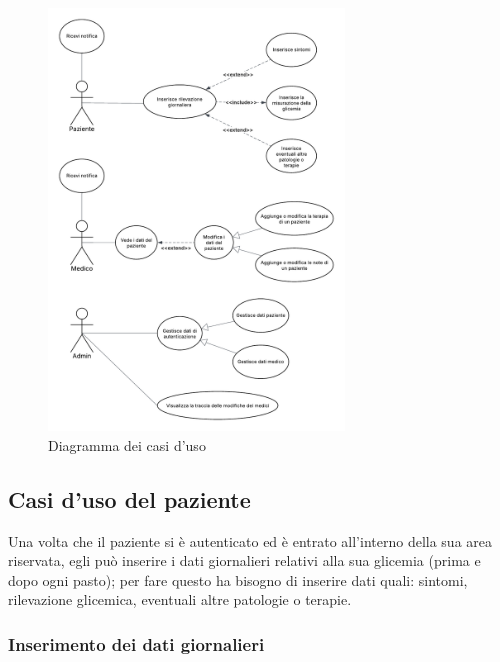 \documentclass[a4paper]{article}
\begin{document}
\begin{figure}[H]
  \centering
  \includegraphics[width=0.7\textwidth]{usecase}
  \caption{Diagramma dei casi d'uso}
  \label{fig:usecase}
\end{figure}

\subsection{Casi d'uso del paziente}

Una volta che il paziente si è autenticato ed è entrato all'interno della sua area riservata, egli può
inserire i dati giornalieri relativi alla sua glicemia (prima e dopo ogni pasto); per fare questo
ha bisogno di inserire dati quali: sintomi, rilevazione glicemica, eventuali altre patologie o terapie.

\subsubsection{Inserimento dei dati giornalieri}
\end{document}
